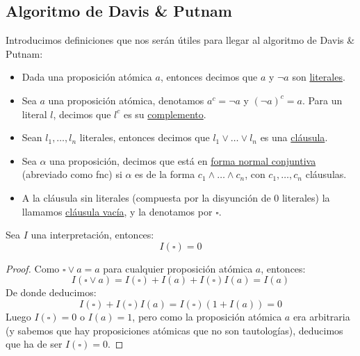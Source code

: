 \subsection{Algoritmo de Davis \& Putnam}
\begin{definicion}
    Introducimos definiciones que nos serán útiles para llegar al algoritmo de Davis \& Putnam:
    \begin{itemize}
        \item Dada una proposición atómica $a$, entonces decimos que $a$ y $\lnot a$ son \underline{literales}.
        \item Sea $a$ una proposición atómica, denotamos $a^c = \lnot a$ y ${(\lnot a)}^{c} = a$. Para un literal $l$, decimos que $l^c$ es su \underline{complemento}.
        \item Sean $l_1,\ldots,l_n$ literales, entonces decimos que $l_1\lor \ldots \lor l_n$ es una \underline{cláusula}.
        \item Sea $\alpha$ una proposición, decimos que está en \underline{forma normal conjuntiva} (abreviado como fnc) si $\alpha$ es de la forma $c_1\land \ldots \land c_n$, con $c_1,\ldots,c_n$ cláusulas.
        \item A la cláusula sin literales (compuesta por la disyunción de 0 literales) la llamamos \underline{cláusula vacía}, y la denotamos por $\square$.
    \end{itemize}
\end{definicion}

\begin{prop}
    Sea $I$ una interpretación, entonces:
    \begin{equation*}
        I(\square) = 0
    \end{equation*}
    \begin{proof}
        Como $\square\lor a = a$ para cualquier proposición atómica $a$, entonces:
        \begin{equation*}
            I(\square\lor a) = I(\square) + I(a) + I(\square)I(a) = I(a)
        \end{equation*}
        De donde deducimos:
        \begin{equation*}
            I(\square) + I(\square)I(a) = I(\square)(1 + I(a)) = 0
        \end{equation*}
        Luego $I(\square)=0$ o $I(a)=1$, pero como la proposición atómica $a$ era arbitraria (y sabemos que hay proposiciones atómicas que no son tautologías), deducimos que ha de ser $I(\square)=0$.
    \end{proof}
\end{prop}

